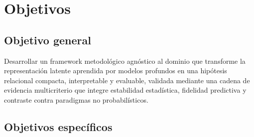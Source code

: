 
\section{Objetivos}

\subsection{Objetivo general}

Desarrollar un framework metodológico agnóstico al dominio que transforme la representación latente aprendida por modelos profundos en una hipótesis relacional compacta, interpretable y evaluable, validada mediante una cadena de evidencia multicriterio que integre estabilidad estadística, fidelidad predictiva y contraste contra paradigmas no probabilísticos.

\subsection{Objetivos específicos}

